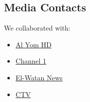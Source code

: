 \documentclass[a4paper,12pt]{article}
\begin{document}
\subsection{Media Contacts}
We collaborated with:
\begin{itemize}
    \item \href{https://www.facebook.com/ejust.official/videos/3449961901956390/}{Al Yom HD}
    \item \href{https://www.facebook.com/Channel1/videos/555933573138009/}{Channel 1}
    \item \href{https://www.facebook.com/ElWatanNews/videos/176552042188662}{El-Watan News}
    \item \href{https://www.facebook.com/watch/?mibextid=6p5qLk&v=1074663143567405}{CTV}
    
\end{itemize}
\end{document}

